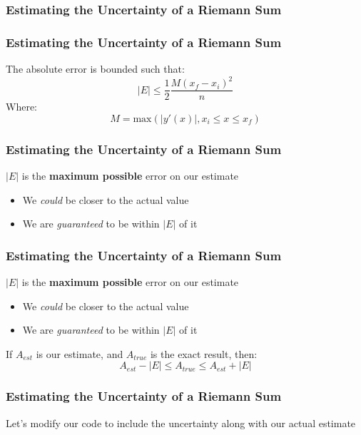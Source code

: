 \documentclass{beamer}
\begin{document}
	\begin{frame}
		\frametitle{Estimating the Uncertainty of a Riemann Sum}
		
	\end{frame}


	\begin{frame}
	\frametitle{Estimating the Uncertainty of a Riemann Sum}
	The absolute error is bounded such that:
	\begin{equation*}
		|E|\leq\frac{1}{2}\frac{M(x_f-x_i)^2}{n}
	\end{equation*}	
	Where:
	\begin{equation*}
		M = \mathrm{max}\left(|y'(x)|, x_i\leq x\leq x_f\right)
	\end{equation*}
	\end{frame}
	
	
	\begin{frame}
	\frametitle{Estimating the Uncertainty of a Riemann Sum}
	$|E|$ is the \textbf{maximum possible} error on our estimate
	\begin{itemize}
		\item We \textit{could} be closer to the actual value
		\item We are \textit{guaranteed} to be within $|E|$ of it
	\end{itemize}
	\end{frame}

	\begin{frame}
	\frametitle{Estimating the Uncertainty of a Riemann Sum}
	$|E|$ is the \textbf{maximum possible} error on our estimate
	\begin{itemize}
		\item We \textit{could} be closer to the actual value
		\item We are \textit{guaranteed} to be within $|E|$ of it
	\end{itemize}
	If $A_{est}$ is our estimate, and $A_{true}$ is the exact result, then:
	\begin{equation*}
		A_{est}-|E|\leq A_{true}\leq A_{est} + |E|
	\end{equation*}
	\end{frame}


	\begin{frame}
	\frametitle{Estimating the Uncertainty of a Riemann Sum}
	Let's modify our code to include the uncertainty along with our actual estimate
	\end{frame}
\end{document}
